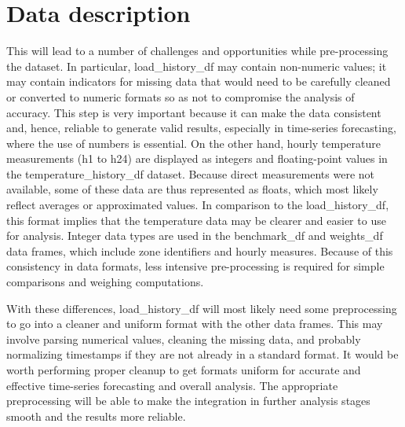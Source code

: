 \documentclass[12pt, a4paper,twoside]{report}
\theoremstyle{plain} %
\theoremstyle{definition} %
\theoremstyle{remark} %
\numberwithin{equation}{chapter}
\begin{document}
\section{Data description}
This will lead to a number of challenges and opportunities while pre-processing the dataset. In particular, load\_history\_df may contain non-numeric values; it may contain indicators for missing data that would need to be carefully cleaned or converted to numeric formats so as not to compromise the analysis of accuracy. This step is very important because it can make the data consistent and, hence, reliable to generate valid results, especially in time-series forecasting, where the use of numbers is essential.
\newline
On the other hand, hourly temperature measurements (h1 to h24) are displayed as integers and floating-point values in the temperature\_history\_df dataset. Because direct measurements were not available, some of these data are thus represented as floats, which most likely reflect averages or approximated values. In comparison to the load\_history\_df, this format implies that the temperature data may be clearer and easier to use for analysis.
Integer data types are used in the benchmark\_df and weights\_df data frames, which include zone identifiers and hourly measures. Because of this consistency in data formats, less intensive pre-processing is required for simple comparisons and weighing computations.

\newline
With these differences, load\_history\_df will most likely need some preprocessing to go into a cleaner and uniform format with the other data frames. This may involve parsing numerical values, cleaning the missing data, and probably normalizing timestamps if they are not already in a standard format. It would be worth performing proper cleanup to get formats uniform for accurate and effective time-series forecasting and overall analysis. The appropriate preprocessing will be able to make the integration in further analysis stages smooth and the results more reliable.
\end{document}
